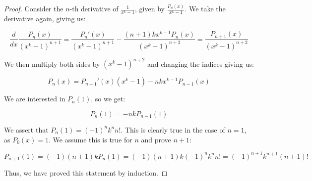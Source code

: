 \documentclass[10pt, oneside]{article}
\begin{document}
    \begin{proof}
      Consider the $n$-th derivative of $\frac{1}{x^k - 1}$, given by $\frac{P_n(x)}{x^k - 1}$. We take the derivative again, giving us:

      $$\frac{d}{dx} \frac{P_n(x)}{(x^k - 1)^{n + 1}} = \frac{P_n'(x)}{(x^k - 1)^{n + 1}} - \frac{(n + 1) kx^{k - 1} P_n(x)}{(x^k - 1)^{n + 2}} = \frac{P_{n + 1}(x)}{(x^k - 1)^{n + 2}}$$

      We then multiply both sides by $(x^k - 1)^{n + 2}$ and changing the indices giving us:

      $$P_{n}(x) = P_{n - 1}'(x) (x^k - 1) - n kx^{k - 1} P_{n - 1}(x)$$

      We are interested in $P_n(1)$, so we get:

      $$P_n(1) = -nk P_{n - 1}(1)$$

      We assert that $P_n(1) = (-1)^n k^n n!$. This is clearly true in the case of $n = 1$, as $P_0(x) = 1$. We assume this is true for $n$ and prove $n + 1$:

      $$P_{n + 1}(1) = (-1) (n + 1) k P_n(1) = (-1) (n + 1)k (-1)^n k^n n! = (-1)^{n + 1} k^{n + 1} (n + 1)!$$

      Thus, we have proved this statement by induction.
      \end{proof}

    
\end{document}
